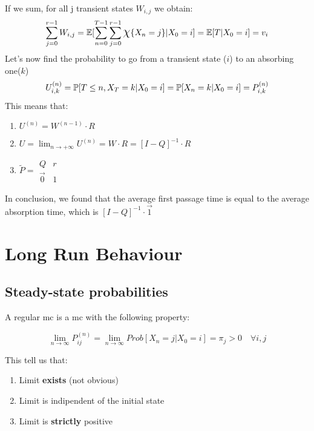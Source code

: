 If we sum, for all j transient states $W_{i,j}$  we obtain:
\begin{equation}
	\sum\limits_{j=0}^{r-1}W_{i,j} = \mathbb{E}[\sum\limits_{n=0}^{T-1}\sum\limits_{j=0}^{r-1}\mbox{\Large $\chi$}\{X_n=j\}|X_0=i] = \mathbb{E}[T|X_0=i]=v_i
\end{equation}
Let's now find the probability to go from a transient state ($i$) to an absorbing one($k$)
\begin{equation}
	U_{i,k}^{(n)} = \mathbb{P}[T \le n , X_T = k | X_0=i] = \mathbb{P}[X_n=k|X_0=i]=P_{i,k}^{(n)}
\end{equation}
This means that:
\begin{enumerate}
	\item $U^{(n)} = W^{(n-1)}\cdot R$
	\item $U=\lim_{n\to +\infty} U^{(n)} = W \cdot R = [I-Q]^{-1}\cdot R$
	\item $\tilde{P}=\begin{matrix} Q & r \\ \vec{0}&1 \end{matrix}$
\end{enumerate}
In conclusion, we found that the average first passage time is equal to the average
 absorption time, which is $[I-Q]^{-1}\cdot \vec{1}$
\section{Long Run Behaviour}
\subsection{Steady-state probabilities}

	\begin{definition}
		A regular \gls{mc} is a \gls{mc} with the following property:

		\begin{equation} \lim_{n \to \infty} P_{ij}^{(n)} = \lim_{ n \to \infty} Prob[ X_n=j | X_0 =i] = \pi_j > 0 \quad \forall i, j \end{equation}

	\end{definition}

	This tell us that:
	\begin{enumerate}
		\item Limit \textbf{exists} (not obvious)
		\item Limit is indipendent of the initial state
		\item Limit is \textbf{strictly} positive
	\end{enumerate}

